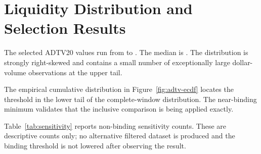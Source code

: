 \section{Liquidity Distribution and Selection Results}

The \SelectedSecurities{} selected ADTV20 values run from
\SelectedADTVMinimum{} to \SelectedADTVMaximum{}. The median is
\SelectedADTVMedian{}. The distribution is strongly right-skewed and contains a
small number of exceptionally large dollar-volume observations at the upper
tail.

\begin{table}[tbp]
\centering
\caption{ADTV20 distribution for complete valid windows}
\label{tab:adtv-quantiles}
\end{table}


\clearpage

The empirical cumulative distribution in
Figure~\ref{fig:adtv-ecdf} locates the threshold in the lower tail of the
complete-window distribution. The near-binding minimum validates that the
inclusive comparison is being applied exactly.

Table~\ref{tab:sensitivity} reports non-binding sensitivity counts. These are
descriptive counts only; no alternative filtered dataset is produced and the
binding threshold is not lowered after observing the result.

\begin{table}[tbp]
\centering
\caption{Non-binding ADTV20 sensitivity counts}
\label{tab:sensitivity}
\end{table}
